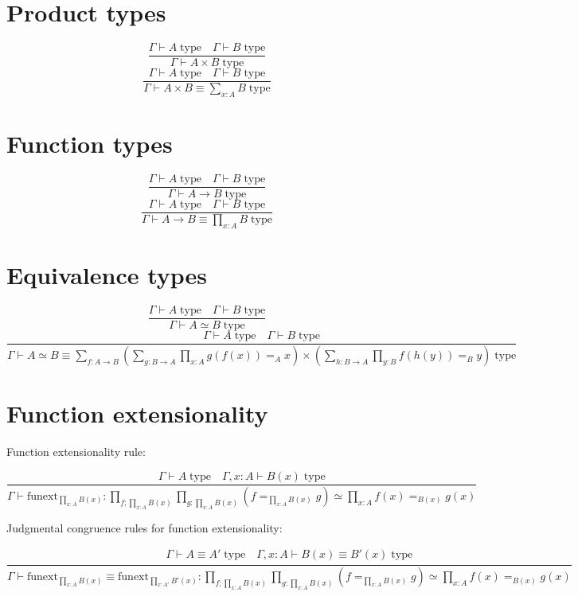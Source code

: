 \documentclass{book}
\begin{document}
\section{Product types}
$$\frac{\Gamma \vdash A \; \mathrm{type} \quad \Gamma \vdash B \; \mathrm{type}}{\Gamma \vdash A \times B \; \mathrm{type}}$$
$$\frac{\Gamma \vdash A \; \mathrm{type} \quad \Gamma \vdash B \; \mathrm{type}}{\Gamma \vdash A \times B \equiv \sum_{x:A} B \; \mathrm{type}}$$

\section{Function types}
$$\frac{\Gamma \vdash A \; \mathrm{type} \quad \Gamma \vdash B \; \mathrm{type}}{\Gamma \vdash A \to B \; \mathrm{type}}$$
$$\frac{\Gamma \vdash A \; \mathrm{type} \quad \Gamma \vdash B \; \mathrm{type}}{\Gamma \vdash A \to B \equiv \prod_{x:A} B \; \mathrm{type}}$$

\section{Equivalence types}

$$\frac{\Gamma \vdash A \; \mathrm{type} \quad \Gamma \vdash B \; \mathrm{type}}{\Gamma \vdash A \simeq B \; \mathrm{type}}$$ 
$$\frac{\Gamma \vdash A \; \mathrm{type} \quad \Gamma \vdash B \; \mathrm{type}}{\Gamma \vdash A \simeq B \equiv \sum_{f:A \to B} \left(\sum_{g:B \to A} \prod_{x:A} g(f(x)) =_A x\right) \times \left(\sum_{h:B \to A} \prod_{y:B} f(h(y)) =_B y\right) \; \mathrm{type}}$$

\section{Function extensionality}

Function extensionality rule:

$$\frac{\Gamma \vdash A \; \mathrm{type} \quad \Gamma, x:A \vdash B(x) \; \mathrm{type}}{\Gamma \vdash \mathrm{funext}_{\prod_{x:A} B(x)}:\prod_{f;\prod_{x:A} B(x)} \prod_{g:\prod_{x:A} B(x)} (f =_{\prod_{x:A} B(x)} g) \simeq \prod_{x:A} f(x) =_{B(x)} g(x)}$$

Judgmental congruence rules for function extensionality:

$$\frac{
\begin{array}{c}
	\Gamma \vdash A \equiv A' \; \mathrm{type} \quad \Gamma, x:A \vdash B(x) \equiv B'(x) \; \mathrm{type}
\end{array}
}{\Gamma \vdash \mathrm{funext}_{\prod_{x:A} B(x)} \equiv \mathrm{funext}_{\prod_{x:A'} B'(x)}:\prod_{f;\prod_{x:A} B(x)} \prod_{g:\prod_{x:A} B(x)} (f =_{\prod_{x:A} B(x)} g) \simeq \prod_{x:A} f(x) =_{B(x)} g(x)}$$
\end{document}

